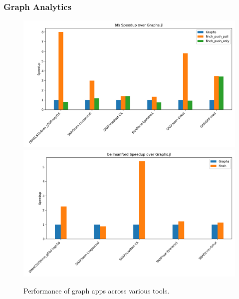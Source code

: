 \documentclass[acmsmall]{acmart}
\begin{document}
\subsubsection{Graph Analytics}
\begin{figure}
	\includegraphics[width=\linewidth]{bfs_speedup_over_graphs.jl.png}
	\includegraphics[width=\linewidth]{bellmanford_speedup_over_graphs.jl.png}
    \caption{Performance of graph apps across various tools.}
\end{figure}
\end{document}

